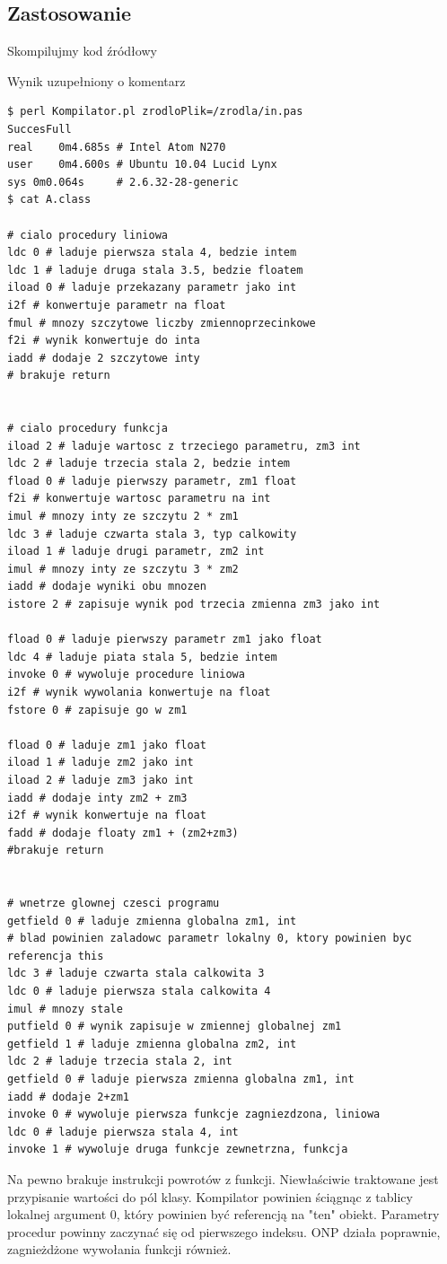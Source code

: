 \documentclass[a4paper,12pt]{article}
\begin{document}
\subsection{Zastosowanie}
Skompilujmy kod źródłowy

Wynik uzupełniony o komentarz
\begin{verbatim}
$ perl Kompilator.pl zrodloPlik=/zrodla/in.pas
SuccesFull
real	0m4.685s # Intel Atom N270
user	0m4.600s # Ubuntu 10.04 Lucid Lynx
sys	0m0.064s     # 2.6.32-28-generic
$ cat A.class 

# cialo procedury liniowa
ldc 0 # laduje pierwsza stala 4, bedzie intem
ldc 1 # laduje druga stala 3.5, bedzie floatem
iload 0 # laduje przekazany parametr jako int
i2f # konwertuje parametr na float
fmul # mnozy szczytowe liczby zmiennoprzecinkowe
f2i # wynik konwertuje do inta
iadd # dodaje 2 szczytowe inty
# brakuje return


# cialo procedury funkcja
iload 2 # laduje wartosc z trzeciego parametru, zm3 int
ldc 2 # laduje trzecia stala 2, bedzie intem
fload 0 # laduje pierwszy parametr, zm1 float
f2i # konwertuje wartosc parametru na int
imul # mnozy inty ze szczytu 2 * zm1
ldc 3 # laduje czwarta stala 3, typ calkowity
iload 1 # laduje drugi parametr, zm2 int
imul # mnozy inty ze szczytu 3 * zm2
iadd # dodaje wyniki obu mnozen
istore 2 # zapisuje wynik pod trzecia zmienna zm3 jako int

fload 0 # laduje pierwszy parametr zm1 jako float
ldc 4 # laduje piata stala 5, bedzie intem
invoke 0 # wywoluje procedure liniowa
i2f # wynik wywolania konwertuje na float
fstore 0 # zapisuje go w zm1

fload 0 # laduje zm1 jako float
iload 1 # laduje zm2 jako int
iload 2 # laduje zm3 jako int
iadd # dodaje inty zm2 + zm3
i2f # wynik konwertuje na float
fadd # dodaje floaty zm1 + (zm2+zm3)
#brakuje return


# wnetrze glownej czesci programu
getfield 0 # laduje zmienna globalna zm1, int
# blad powinien zaladowc parametr lokalny 0, ktory powinien byc referencja this
ldc 3 # laduje czwarta stala calkowita 3
ldc 0 # laduje pierwsza stala calkowita 4
imul # mnozy stale
putfield 0 # wynik zapisuje w zmiennej globalnej zm1
getfield 1 # laduje zmienna globalna zm2, int
ldc 2 # laduje trzecia stala 2, int
getfield 0 # laduje pierwsza zmienna globalna zm1, int
iadd # dodaje 2+zm1
invoke 0 # wywoluje pierwsza funkcje zagniezdzona, liniowa
ldc 0 # laduje pierwsza stala 4, int
invoke 1 # wywoluje druga funkcje zewnetrzna, funkcja
\end{verbatim}
Na pewno brakuje instrukcji powrotów z funkcji. Niewłaściwie traktowane jest przypisanie wartości do pól klasy. Kompilator powinien ściągnąc z tablicy lokalnej argument 0, który powinien być referencją na "ten" obiekt. Parametry procedur powinny zaczynać się od pierwszego indeksu. ONP działa poprawnie, zagnieżdżone wywołania funkcji również.
\end{document}
